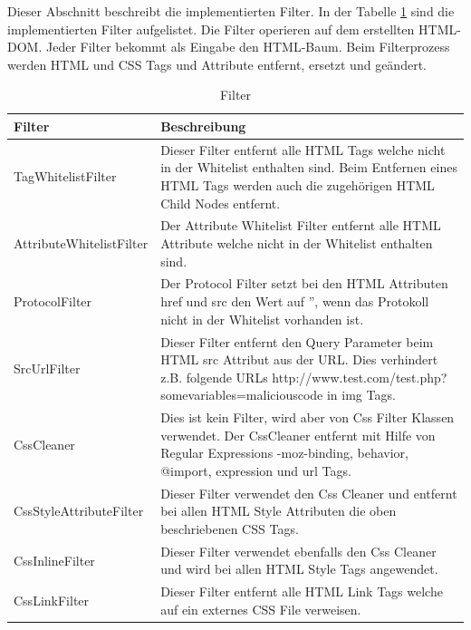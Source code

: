 Dieser Abschnitt beschreibt die implementierten Filter. 
In der Tabelle \ref{tab:filter} sind die implementierten Filter aufgelistet. Die Filter operieren auf dem erstellten HTML-DOM.
Jeder Filter bekommt als Eingabe den HTML-Baum. Beim Filterprozess werden HTML und CSS Tags und Attribute entfernt, ersetzt und geändert.
\newline
\begin{table}[H]
\begin{center}
\begin{tabular}{l p{10.5cm} }
\hline
\textbf{Filter} & \textbf{Beschreibung} \\ \hline \hline
TagWhitelistFilter & Dieser Filter entfernt alle HTML Tags welche nicht in der Whitelist enthalten sind. 
Beim Entfernen eines HTML Tags werden auch die zugehörigen HTML Child Nodes entfernt. \\ 

AttributeWhitelistFilter & Der Attribute Whitelist Filter entfernt alle HTML Attribute welche nicht in der Whitelist enthalten sind. \\

ProtocolFilter & Der Protocol Filter setzt bei den HTML Attributen href und src den Wert auf '', wenn das Protokoll nicht in der Whitelist vorhanden ist. \\

SrcUrlFilter & Dieser Filter entfernt den Query Parameter beim HTML src Attribut aus der URL. Dies verhindert z.B. folgende URLs http://www.test.com/test.php?somevariables=maliciouscode in img Tags. \\

CssCleaner & Dies ist kein Filter, wird aber von Css Filter Klassen verwendet. Der CssCleaner entfernt mit Hilfe von Regular Expressions -moz-binding, behavior, @import, expression und url Tags. \\

CssStyleAttributeFilter & Dieser Filter verwendet den Css Cleaner und entfernt bei allen HTML Style Attributen die oben beschriebenen CSS Tags. \\

CssInlineFilter & Dieser Filter verwendet ebenfalls den Css Cleaner und wird bei allen HTML Style Tags angewendet. \\

CssLinkFilter & Dieser Filter entfernt alle HTML Link Tags welche auf ein externes CSS File verweisen. \\

\hline \hline
\end{tabular}
\caption{Filter}
\label{tab:filter}
\end{center}
\end{table}

